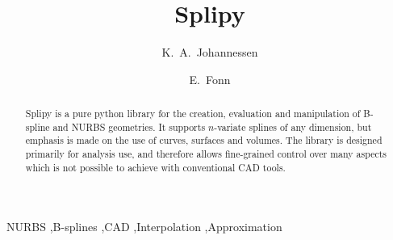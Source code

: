 \documentclass[preprint,12pt, a4paper]{elsarticle}
\begin{document}
\begin{frontmatter}



\title{Splipy}


\author{K.~A.~Johannessen}
\author{E.~Fonn}

\address{SINTEF Digital, PO Box 4760, 7465, Trondheim, Norway}

\begin{abstract}
Splipy is a pure python library for the creation, evaluation and manipulation of B-spline and NURBS geometries. It supports $n$-variate splines of any dimension, but emphasis is made on the use of curves, surfaces and volumes. The library is designed primarily for analysis use, and therefore allows fine-grained control over many aspects which is not possible to achieve with conventional CAD tools.

\end{abstract}

\begin{keyword}
NURBS \sep B-splines \sep CAD \sep Interpolation \sep Approximation



\end{keyword}

\end{frontmatter}
\end{document}
